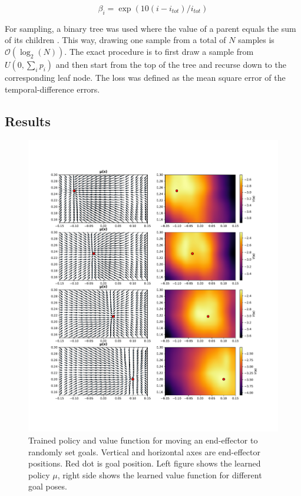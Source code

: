 \begin{equation}
    \beta_i = \exp \left( 10(i - i_{tot}) / i_{tot}\right)
\end{equation}

For sampling, a binary tree was used where the value of a parent equals the sum
of its children \cite{schaul2015prioritized}. This way, drawing one sample
from a total of $N$ samples is $\mathcal{O}(\log_2(N))$. The exact procedure is
to first draw a sample from $U(0, \sum_i p_i)$ and then start from the top of
the tree and recurse down to the corresponding leaf node. The loss was defined
as the mean square error of the temporal-difference errors.

\subsection{Results}

\begin{figure}[h]
    \centering
    \includegraphics[width=\textwidth]{res/moving_goal_summary.pdf}

    \caption{Trained policy and value function for moving an end-effector to
    randomly set goals. Vertical and horizontal axes are end-effector
    positions. Red dot is goal position. Left figure shows the learned policy
    $\mu$, right side shows the learned value function for different goal
    poses.}
    
\end{figure}

